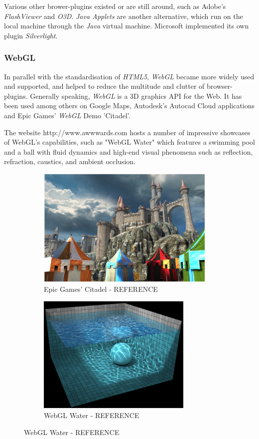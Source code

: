 \documentclass[a4paper,11pt,twoside]{article}
\begin{document}
Various other brower-plugins existed or are still around, such as Adobe's \textit{FlashViewer} and \textit{O3D}. \textit{Java Applets} are another alternative, which run on the local machine through the \textit{Java} virtual machine. Microsoft implemented its own plugin \textit{Silverlight}.


\subsubsection{WebGL}

In parallel with the standardisation of \textit{HTML5}, \textit{WebGL} became more widely used and supported, and helped to reduce the multitude and clutter of browser-plugins. Generally speaking, \textit{WebGL} is a 3D graphics API for the Web. It has been used among others on Google Maps, Autodesk's Autocad Cloud applications and Epic Games' \textit{WebGL} Demo 'Citadel'.

The website http://www.awwwards.com hosts a number of impressive showcases of WebGL's capabilities, such as "WebGL Water"  which features a swimming pool and a ball with fluid dynamics and high-end visual phenomena such as reflection, refraction, caustics, and ambient occlusion.

\begin{figure}
\centering
\begin{subfigure}{.5\textwidth}
  \centering
  \includegraphics[width=86mm]{graphics/webGL_01.png}
\caption{Epic Games' Citadel - REFERENCE}

  \label{fig:sub1}
\end{subfigure}%
\begin{subfigure}{.5\textwidth}
  \centering
  \includegraphics[width=74mm]{graphics/webGL_02.png}
	\caption{WebGL Water - REFERENCE}

  \label{fig:sub2}
\end{subfigure}


\end{figure}
\end{document}
